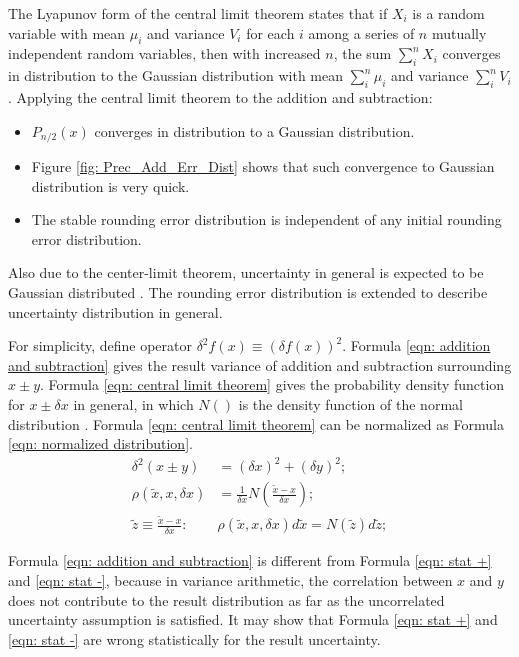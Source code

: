\documentclass[twoside]{article}
\numberwithin{equation}{section}
\newcommand{\eqspace}{\;\;\;}
\begin{document}
The Lyapunov form of the central limit theorem \cite{Probability_Statistics} states that if $X_i$ is a random variable with mean $\mu_i$ and variance $V_i$ for each $i$ among a series of $n$ mutually independent random variables, then with increased $n$, the sum $\sum\limits_{i}^{n} X_i$ converges in distribution to the Gaussian distribution with mean $\sum\limits_{i}^{n} \mu_i$ and variance $\sum\limits_{i}^{n} V_i$. Applying the central limit theorem to the addition and subtraction: 
\begin{itemize} 
\item $P_{n/2}(x)$ converges in distribution to a Gaussian distribution.

\item Figure \ref{fig: Prec_Add_Err_Dist} shows that such convergence to Gaussian distribution is very quick. 

\item The stable rounding error distribution is independent of any initial rounding error distribution. 
\end{itemize} 

Also due to the center-limit theorem, uncertainty in general is expected to be Gaussian distributed \cite{Statistical_Methods} \cite{Probability_Statistics}. 
The rounding error distribution is extended to describe uncertainty distribution in general.

For simplicity, define operator $\delta^2 f(x) \equiv (\delta f(x))^2$. 
Formula \eqref{eqn: addition and subtraction} gives the result variance of addition and subtraction surrounding $x \pm y$.
Formula \eqref{eqn: central limit theorem} gives the probability density function for $x \pm \delta x$ in general, in which $N()$ is the density function of the  normal distribution \cite{Probability_Statistics}.
Formula \eqref{eqn: central limit theorem} can be normalized as Formula \eqref{eqn: normalized distribution}.
\begin{align}
\label{eqn: addition and subtraction}
\delta^2 (x \pm y) &= (\delta x)^2 + (\delta y)^2; \\
\label{eqn: central limit theorem}
\rho(\tilde{x}, x, \delta x) & = \frac{1}{\delta x} N(\frac{\tilde{x} - x}{\delta x}); \\
\label{eqn: normalized distribution}
\tilde{z} \equiv \frac{\tilde{x} - x}{\delta x}:\eqspace & \rho(\tilde{x}, x, \delta x) d \tilde{x} = N(\tilde{z}) d \tilde{z};
\end{align}

Formula \eqref{eqn: addition and subtraction} is different from Formula \eqref{eqn: stat +} and \eqref{eqn: stat -}, because in variance arithmetic, the correlation between $x$ and $y$ does not contribute to the result distribution as far as the uncorrelated uncertainty assumption is satisfied.
It may show that Formula \eqref{eqn: stat +} and \eqref{eqn: stat -} are wrong statistically for the result uncertainty.
\end{document}
